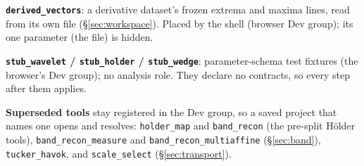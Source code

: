 \documentclass[10pt]{article}
\newcommand{\dev}[1]{\texttt{#1}}
\begin{document}
\textbf{\dev{derived\_vectors}}: a derivative dataset's frozen extrema and maxima lines, read
from its own file (\S\ref{sec:workspace}). Placed by the shell (browser Dev group); its one
parameter (the file) is hidden.

\textbf{\dev{stub\_wavelet} / \dev{stub\_holder} / \dev{stub\_wedge}}: parameter-schema
test fixtures (the browser's Dev group); no analysis role. They declare no contracts, so every
step after them applies.

\textbf{Superseded tools} stay registered in the Dev group, so a saved project that names one
opens and resolves: \dev{holder\_map} and \dev{band\_recon} (the pre-split H\"older tools),
\dev{band\_recon\_measure} and \dev{band\_recon\_multiaffine} (\S\ref{sec:band}),
\dev{tucker\_havok}, and
\dev{scale\_select} (\S\ref{sec:transport}).

\end{document}
